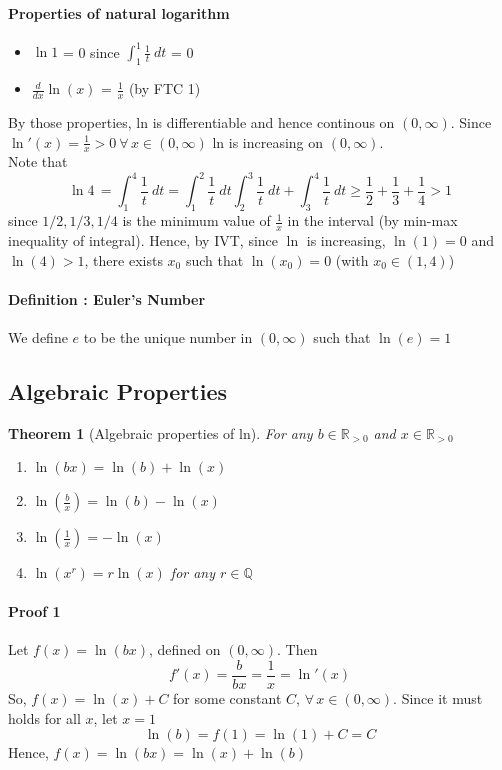 \documentclass[12pt]{article}
\newtheorem{theorem}{Theorem}
\begin{document}
\paragraph{Properties of natural logarithm}
\begin{itemize} 
     \item $\ln 1$ = 0 since $\int_1^1 \frac{1}{t}\: dt$ = 0
     \item $\frac{d}{dx} \ln(x)$ = $\frac{1}{x}$ (by FTC 1)
\end{itemize}

By those properties, ln is differentiable and hence continous on $(0, \infty)$. Since $\ln'(x) = \frac{1}{x} > 0 \: \forall \, x \in(0, \infty)$
ln is increasing on $(0, \infty)$. \\
Note that
\[
    \ln 4\, = \int_1^4 \frac{1}{t} \: dt = \int_1^2 \frac{1}{t} \: dt \int_2^3 \frac{1}{t} \: dt + \int_3^4 \frac{1}{t} \: dt \geq \frac{1}{2} + \frac{1}{3} + \frac{1}{4} > 1
\]
since $1/2, 1/3, 1/4$ is the minimum value of $\frac{1}{x}$ in the interval (by min-max inequality of integral).
Hence, by IVT, since $\ln$ is increasing, $\ln(1) = 0$ and $\ln(4) > 1$, there exists $x_0$ such that $\ln(x_0) = 0$ (with $x_0 \in (1, 4)$)
\paragraph{Definition : Euler's Number}
We define $e$ to be the unique number in $(0, \infty)$ such that $\ln(e) = 1$
\subsection{Algebraic Properties}
\begin{theorem}[Algebraic properties of ln]
    For any $b \in \mathbb{R}_{>0}$ and $x \in \mathbb{R}_{>0}$
    \begin{enumerate} 
         \item $\ln(bx) = \ln(b) + \ln(x)$
         \item $\ln(\frac{b}{x}) = \ln(b) - \ln(x)$
         \item $\ln(\frac{1}{x}) = - \ln(x)$
         \item $\ln(x^r) = r \ln(x)$ for any $r \in \mathbb{Q}$
    \end{enumerate}
\end{theorem}

\paragraph{Proof 1}
Let $f(x) = \ln(bx)$, defined on $(0, \infty)$. Then 
\[
    f'(x) = \frac{b}{bx} = \frac{1}{x} = \ln'(x)
\]
So, $f(x) = \ln(x) + C$ for some constant $C$, $\forall \, x \in (0, \infty)$. Since it must holds for
all $x$, let $x = 1$
\[
    \ln(b) = f(1) = \ln(1) + C = C
\]
Hence, $f(x) = \ln(bx) = \ln(x) + \ln(b)$
\end{document}
